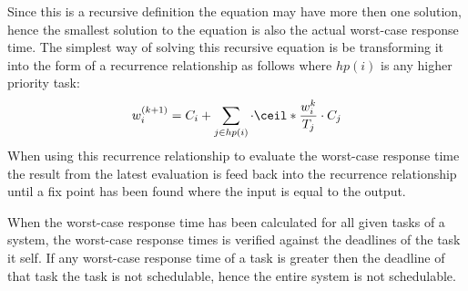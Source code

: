 Since this is a recursive definition the equation may have more then one solution, hence the smallest solution to the equation is also the actual worst-case response time. 
The simplest way of solving this recursive equation is be transforming it into the form of a recurrence relationship as follows where $hp(i)$ is any higher priority task:
\begin{equation}
w^{(k+1)}_{i} = C_i + \sum_{j\in hp(i)} \cdot \ceil*{\frac{w^{k}_{i}}{T_j}} \cdot C_j
\end{equation}
When using this recurrence relationship to evaluate the worst-case response time the result from the latest evaluation is feed back into the recurrence relationship until a fix point has been found where the input is equal to the output. 

When the worst-case response time has been calculated for all given tasks of a system, the worst-case response times is verified against the deadlines of the task it self.
If any worst-case response time of a task is greater then the deadline of that task the task is not schedulable, hence the entire system is not schedulable. 
